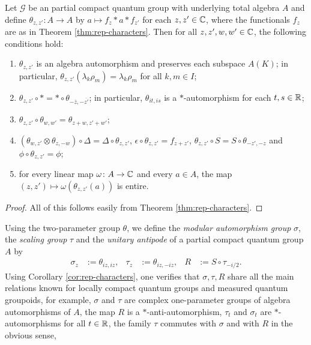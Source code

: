 \begin{Cor} \label{cor:rep-characters}
  Let $\mathscr{G}$ be an partial compact quantum group with
  underlying total algebra $A$ and define $\theta_{z,z'}
  \colon A \to A$ by $a \mapsto f_{z} \ast a \ast f_{z'}$ for each
  $z,z' \in \mathbb{C}$, where the functionals $f_{z}$ are as in Theorem
  \ref{thm:rep-characters}. Then for all $z,z',w,w'\in \mathbb{C}$, the
  following conditions hold:
  \begin{enumerate}
  \item $\theta_{z,z'}$ is an algebra automorphism and preserves
    each subspace $A(K)$; in particular,
    $\theta_{z,z'}(\lambda_{k}\rho_{m}) = \lambda_{k}\rho_{m}$ for all
    $k,m\in I$;
  \item $\theta_{z,z'} \circ * = * \circ
    \theta_{-\overline{z},-\overline{z'}}$; in particular,
    $\theta_{it,is}$ is a $*$-automorphism for each $t,s\in \mathbb{R}$;
  \item $\theta_{z,z'}\circ \theta_{w,w'} = \theta_{z+w,z'+w'}$;
  \item $ (\theta_{w,z'} \otimes \theta_{z,-w}) \circ \Delta = \Delta
    \circ \theta_{z,z'}$, $\epsilon \circ \theta_{z,z'} = f_{z+z'}$,
    $\theta_{z,z'} \circ S = S \circ \theta_{-z',-z}$ and
    $\phi \circ \theta_{z,z'} = \phi$;
  \item for every linear map $\omega \colon A \to \mathbb{C}$ and every $a\in
    A$, the map $(z,z') \mapsto \omega(\theta_{z,z'}(a))$ is entire.
  \end{enumerate}
\end{Cor}
\begin{proof}
  All of this follows easily from Theorem \ref{thm:rep-characters}.
\end{proof}
Using the two-parameter group $\theta$, we define the \emph{modular
  automorphism group} $\sigma$, the \emph{scaling group} $\tau$   and
the \emph{unitary antipode} of a partial compact quantum group $A$ by
\begin{align*}
  \sigma_{z} &:=\theta_{iz,iz}, & \tau_{z} &:=\theta_{iz,-iz}, & R&:=S
  \circ \tau_{-i/2}.
\end{align*}
Using Corollary \ref{cor:rep-characters}, one verifies that
$\sigma,\tau,R$ share all the main relations known for locally compact
quantum groups and measured quantum groupoids, for example, $\sigma$
and $\tau$ are complex one-parameter groups of algebra automorphisms
of $A$, the map $R$ is a $*$-anti-automorphism,  $\tau_{t}$ and
$\sigma_{t}$ are $*$-automorphisms for all $t\in \mathbb{R}$, the family  $\tau$ commutes with
$\sigma$ and with $R$ in the obvious sense, 
